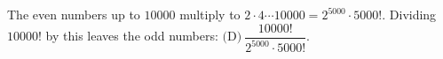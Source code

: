 The even numbers up to $10000$ multiply to $2\cdot4\cdots10000=2^{5000}\cdot5000!$. Dividing $10000!$ by this leaves the odd numbers: $\boxed{\text{(D)}\ \dfrac{10000!}{2^{5000}\cdot5000!}}$.
